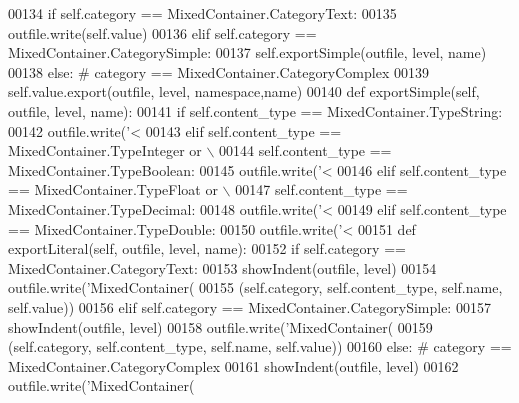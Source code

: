 \begin{DoxyCode}
{{{{{{{{{{{{{00134         \textcolor{keywordflow}{if} self.category == MixedContainer.CategoryText:
00135             outfile.write(self.value)
00136         \textcolor{keywordflow}{elif} self.category == MixedContainer.CategorySimple:
00137             self.exportSimple(outfile, level, name)
00138         \textcolor{keywordflow}{else}:    \textcolor{comment}{# category == MixedContainer.CategoryComplex}
00139             self.value.export(outfile, level, namespace,name)
00140     \textcolor{keyword}{def }exportSimple(self, outfile, level, name):
00141         \textcolor{keywordflow}{if} self.content_type == MixedContainer.TypeString:
00142             outfile.write(\textcolor{stringliteral}{'<%
00143         \textcolor{keywordflow}{elif} self.content_type == MixedContainer.TypeInteger \textcolor{keywordflow}{or} \(\backslash\)
00144                 self.content_type == MixedContainer.TypeBoolean:
00145             outfile.write(\textcolor{stringliteral}{'<%
00146         \textcolor{keywordflow}{elif} self.content_type == MixedContainer.TypeFloat \textcolor{keywordflow}{or} \(\backslash\)
00147                 self.content_type == MixedContainer.TypeDecimal:
00148             outfile.write(\textcolor{stringliteral}{'<%
00149         \textcolor{keywordflow}{elif} self.content_type == MixedContainer.TypeDouble:
00150             outfile.write(\textcolor{stringliteral}{'<%
00151     \textcolor{keyword}{def }exportLiteral(self, outfile, level, name):
00152         \textcolor{keywordflow}{if} self.category == MixedContainer.CategoryText:
00153             showIndent(outfile, level)
00154             outfile.write(\textcolor{stringliteral}{'MixedContainer(%
00155                 (self.category, self.content_type, self.name, self.value))
00156         \textcolor{keywordflow}{elif} self.category == MixedContainer.CategorySimple:
00157             showIndent(outfile, level)
00158             outfile.write(\textcolor{stringliteral}{'MixedContainer(%
00159                 (self.category, self.content_type, self.name, self.value))
00160         \textcolor{keywordflow}{else}:    \textcolor{comment}{# category == MixedContainer.CategoryComplex}
00161             showIndent(outfile, level)
00162             outfile.write(\textcolor{stringliteral}{'MixedContainer(%
}}}}}}}}}}}}}}}}}}}}
\end{DoxyCode}
